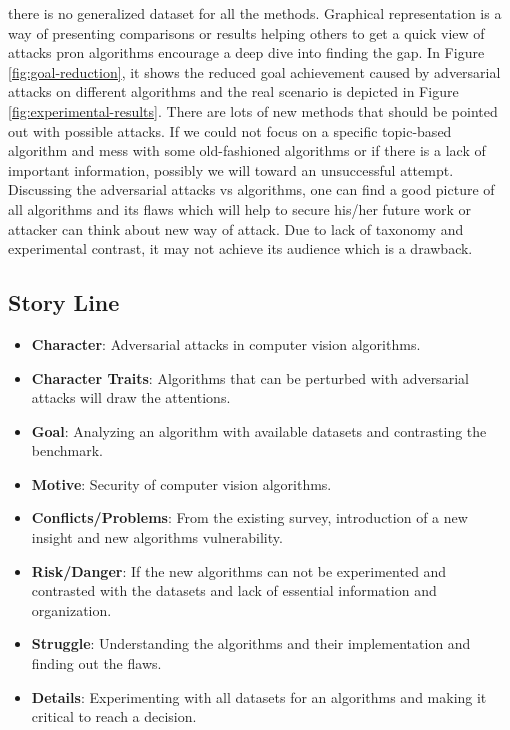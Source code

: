 there is no generalized dataset for all the methods. Graphical representation is a way of presenting comparisons or results helping others to get a quick view of attacks pron algorithms encourage a deep dive into finding the gap. In Figure \ref{fig:goal-reduction}, it shows the reduced goal achievement caused by adversarial attacks on different algorithms and the real scenario is depicted in Figure \ref{fig:experimental-results}. There are lots of new methods that should be pointed out with possible attacks. If we could not focus on a specific topic-based algorithm and mess with some old-fashioned algorithms or if there is a lack of important information, possibly we will toward an unsuccessful attempt. Discussing the adversarial attacks vs algorithms, one can find a good picture of all algorithms and its flaws which will help to secure his/her future work or attacker can think about new way of attack. Due to lack of taxonomy and experimental contrast, it may not achieve its audience which is a drawback.\\

\subsection{Story Line}
\begin{itemize}
    \item \textbf{Character}: Adversarial attacks in computer vision algorithms.
    \item \textbf{Character Traits}: Algorithms that can be perturbed with adversarial attacks will draw the attentions.
    \item \textbf{Goal}: Analyzing an algorithm with available datasets and contrasting the benchmark.
    \item \textbf{Motive}: Security of computer vision algorithms.
    \item \textbf{Conflicts/Problems}: From the existing survey, introduction of a new insight and new algorithms vulnerability.
    \item \textbf{Risk/Danger}: If the new algorithms can not be experimented and contrasted with the datasets and lack of essential information and organization.
    \item \textbf{Struggle}: Understanding the algorithms and their implementation and finding out the flaws.
    \item \textbf{Details}: Experimenting with all datasets for an algorithms and making it critical to reach a decision.
\end{itemize}

